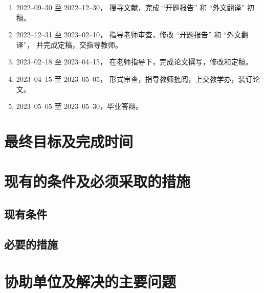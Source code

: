 \documentclass{ctgu-repo}
\begin{document}
\begin{enumerate}
      \item 2022--09--30 至 2022--12--30，
            搜寻文献，完成 ``开题报告'' 和 ``外文翻译'' 初稿。

      \item 2022--12--31 至 2023--02--10，
            指导老师审查，修改 ``开题报告'' 和 ``外文翻译''，
            并完成定稿，交指导教师。

      \item 2023--02--18 至 2023--04--15，
            在老师指导下，完成论文撰写，修改和定稿。

      \item 2023--04--15 至 2023--05--05，
            形式审查，指导教师批阅，上交教学办，装订论文。

      \item 2023--05--05 至 2023--05--30，毕业答辩。
\end{enumerate}

\section{最终目标及完成时间}

\blindtext

\section{现有的条件及必须采取的措施}

\subsection{现有条件}

\blindtext

\subsection{必要的措施}

\blindtext

\section{协助单位及解决的主要问题}

\blindtext

\nocite{*}
\printbibliography[title=参考文献]
\end{document}
